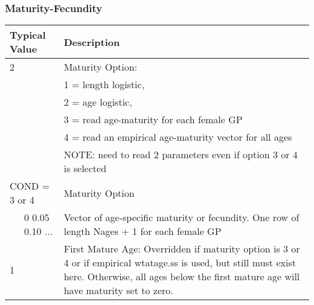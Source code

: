 \subsubsection{Maturity-Fecundity}


\begin{longtable}{p{0.5cm} p{2cm} p{12cm}}
		\multicolumn{2}{l}{Typical Value} & Description \\
		\hline
	    2 & & Maturity Option: \\
	     & & 1 = length logistic,\\
	     & & 2 = age logistic,\\
	     & & 3 = read age-maturity for each female GP\\
	     & & 4 = read an empirical age-maturity vector for all ages\\
	     & & NOTE: need to read 2 parameters even if option 3 or 4 is selected \\
	   \hline

	   \multicolumn{2}{l}{COND = 3 or 4} & Maturity Option\\
	   & 0 0.05 0.10 ... & Vector of age-specific maturity or fecundity.  One row of length Nages + 1 for each female GP\\
	   \hline

	   \hypertarget{WAA}{}

	   
	   1 & & First Mature Age: Overridden if maturity option is 3 or 4 or if empirical wtatage.ss is used, but still must exist here.  Otherwise, all ages below the first mature age will have maturity set to zero.\\
	   \hline	  


\end{longtable}
